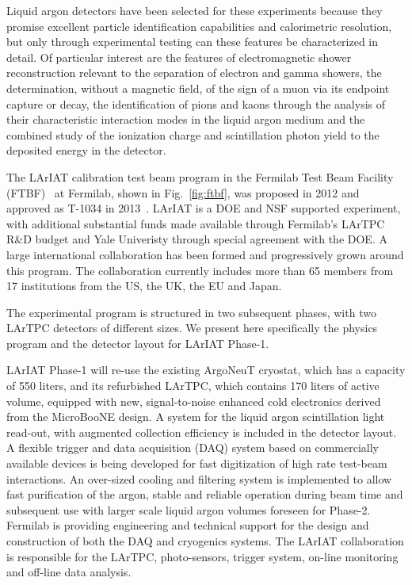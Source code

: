 \documentclass[DIV=calc, paper=a4, fontsize=10pt, twocolumn]{scrartcl}	 %
\begin{document}
{Liquid argon detectors have been selected for these experiments because they promise excellent particle identification capabilities and calorimetric resolution, but only through experimental testing can these features be characterized in detail. Of particular interest are the features of electromagnetic shower reconstruction relevant to the separation of electron and gamma showers, the determination, without a magnetic field, of the sign of a muon via its endpoint capture or decay,  the identification of pions and kaons through the analysis of  their characteristic interaction modes in the liquid argon medium and the combined study of the ionization charge and scintillation photon yield to the deposited energy in the detector. 
 
 The LArIAT calibration test beam program in the Fermilab Test Beam Facility (FTBF)~\cite{FTBF} at Fermilab, shown in Fig.~\ref{fig:ftbf},  was proposed in 2012 and approved as T-1034 in 2013~\cite{LArIAT-MoU}. LArIAT is a DOE and NSF supported experiment, with additional substantial funds made available  through Fermilab's  LArTPC R\&D budget and Yale Univeristy through special agreement with the DOE.   A large international collaboration has been formed and progressively grown around this program. The collaboration currently includes more than 65 members from 17 institutions from the US, the UK, the EU and Japan. 

The experimental program is structured in two subsequent phases, with two LArTPC detectors of different sizes. We present here specifically the physics program and the detector layout for LArIAT Phase-1.

LArIAT Phase-1 will re-use the existing ArgoNeuT cryostat, which has a capacity of 550 liters, and its refurbished LArTPC, which contains 170 liters of active volume, equipped with new, signal-to-noise enhanced cold electronics derived from the MicroBooNE design. A system for the liquid argon scintillation light read-out, with augmented collection efficiency  is included in the detector layout.   A flexible trigger and data acquisition (DAQ) system based on commercially available devices is being developed for fast digitization of high rate test-beam interactions.  An over-sized cooling and filtering system is implemented to allow fast purification of the argon, stable and reliable operation during beam time and subsequent use with larger scale liquid argon volumes foreseen for Phase-2. Fermilab is providing engineering and technical support for the design and construction of both the DAQ and cryogenics systems. The LArIAT collaboration is responsible for the LArTPC, photo-sensors, trigger system, on-line monitoring and off-line data analysis. 

}
\end{document}
